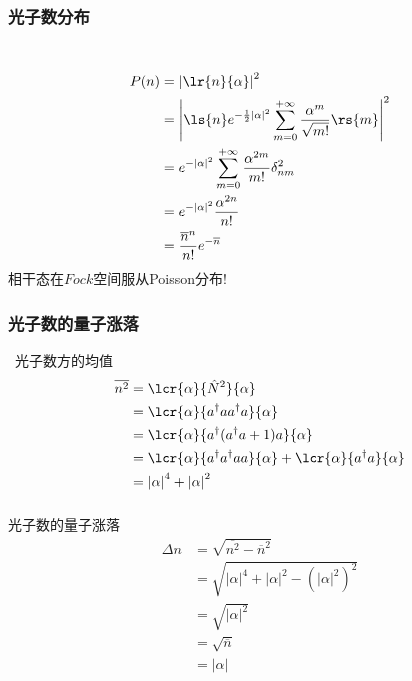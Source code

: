 \begin{frame}
    \frametitle{光子数分布}
        \解 ~    
    \[ \begin{aligned}
     P (n) &=\left|\lr{n}{\alpha}\right|^2 \\ 
    &= \left|\ls{n} e^{-\frac{1}{2}\left|\alpha\right|^2}  \sum_{m=0} ^{+\infty}  \frac{\alpha^m}{\sqrt{m!}} \rs{m} \right|^2\\
    &=  e^{-\left|\alpha\right|^2}  \sum_{m=0} ^{+\infty}  \frac{\alpha^{2m}}{m!} \delta_{nm} ^2  \\ 
    &=  e^{-\left|\alpha\right|^2}  \frac{\alpha^{2n}}{n!} \\
    &=  \frac{ \overline{n} ^{n} }{n!}e^{-\overline{n}} 
    \end{aligned}\]
    相干态在$Fock$空间服从Poisson分布! 
\end{frame} 

\begin{frame}
    \frametitle{光子数的量子涨落}
        \解 ~光子数方的均值 
    \[ \begin{aligned}
    \overline{n^2}&=\lcr{\alpha}{\hat{N}^2}{\alpha} \\ 
    &= \lcr{\alpha}{a^{\dagger} a a^{\dagger} a  }{\alpha}  \\ 
    &= \lcr{\alpha}{a^{\dagger} (a^{\dagger}  a+1) a  }{\alpha}  \\ 
    &= \lcr{\alpha}{a^{\dagger} a^{\dagger}  a a  }{\alpha} + \lcr{\alpha}{a^{\dagger} a  }{\alpha}  \\ 
    &= \left| \alpha\right|^4 + \left| \alpha\right|^2
    \end{aligned}\]

\end{frame}

\begin{frame}
      \frametitle{}  
    光子数的量子涨落
    \[
    \begin{aligned}
    \Delta n & = \sqrt{ \overline{n^2}- \overline{n}^2} \\ 
    & = \sqrt{ \left| \alpha\right|^4 + \left| \alpha\right|^2- (\left| \alpha\right|^2)^2} \\ 
    & = \sqrt{  \left| \alpha\right|^2} \\ 
    & = \sqrt{ \overline{n}} \\ 
    &= \left| \alpha\right|
    \end{aligned}    
    \]
\end{frame} 

